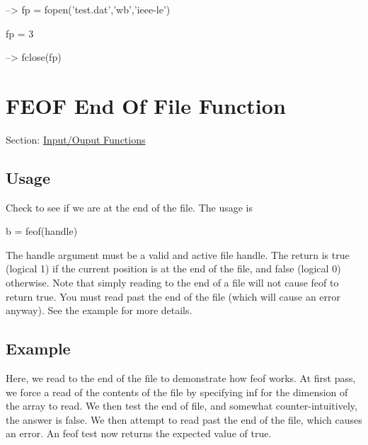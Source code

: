 \begin{DoxyVerbInclude}
--> fp = fopen('test.dat','wb','ieee-le')

fp = 
 3 

--> fclose(fp)
\end{DoxyVerbInclude}
 \hypertarget{io_feof}{}\section{F\-E\-O\-F End Of File Function}\label{io_feof}
Section\-: \hyperlink{sec_io}{Input/\-Ouput Functions} \hypertarget{vtkwidgets_vtkxyplotwidget_Usage}{}\subsection{Usage}\label{vtkwidgets_vtkxyplotwidget_Usage}
Check to see if we are at the end of the file. The usage is \begin{DoxyVerb}  b = feof(handle)
\end{DoxyVerb}
 The {\ttfamily handle} argument must be a valid and active file handle. The return is true (logical 1) if the current position is at the end of the file, and false (logical 0) otherwise. Note that simply reading to the end of a file will not cause {\ttfamily feof} to return {\ttfamily true}. You must read past the end of the file (which will cause an error anyway). See the example for more details. \hypertarget{variables_struct_Example}{}\subsection{Example}\label{variables_struct_Example}
Here, we read to the end of the file to demonstrate how {\ttfamily feof} works. At first pass, we force a read of the contents of the file by specifying {\ttfamily inf} for the dimension of the array to read. We then test the end of file, and somewhat counter-\/intuitively, the answer is {\ttfamily false}. We then attempt to read past the end of the file, which causes an error. An {\ttfamily feof} test now returns the expected value of {\ttfamily true}.



